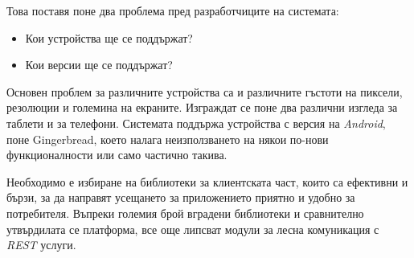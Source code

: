 	Това поставя поне два проблема пред разработчиците на системата:
	
	\begin{itemize}
		\item Кои устройства ще се поддържат?
		\item Кои версии ще се поддържат?
	\end{itemize}
	
	Основен проблем за различните устройства са и различните гъстоти на пиксели, резолюции и големина на екраните. Изграждат се поне два различни изгледа за таблети и за телефони. Системата поддържа устройства с версия на \emph{Android}, поне Gingerbread, което налага неизползването на някои по-нови функционалности или само частично такива.
	
	Необходимо е избиране на библиотеки за клиентската част, които са ефективни и бързи, за да направят усещането за приложението приятно и удобно за потребителя. Въпреки големия брой вградени библиотеки и сравнително утвърдилата се платформа, все още липсват модули за лесна комуникация с \emph{REST} услуги.
